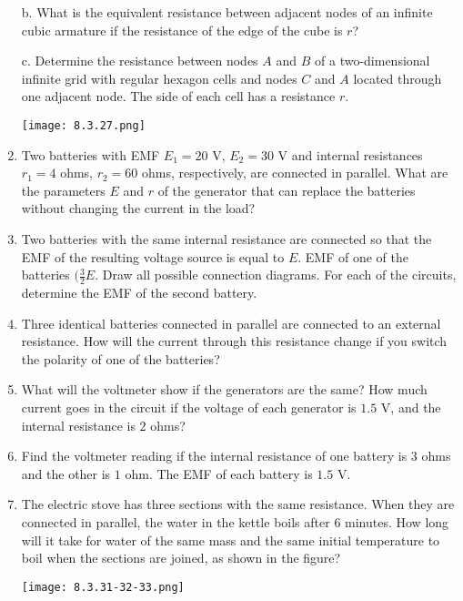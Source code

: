 \documentclass{article}
\begin{document}
\begin{enumerate}[label=8.3.\arabic*]
b. What is the equivalent resistance between adjacent nodes of an infinite cubic armature if the resistance of the edge of the cube is $r$?

c. Determine the resistance between nodes $A$ and $B$ of a two-dimensional infinite grid with regular hexagon cells and nodes $C$ and $A$ located through one adjacent node. The side of each cell has a resistance $r$.

\begin{center}
    \texttt{[image: 8.3.27.png]}
\end{center}


\item Two batteries with EMF $E_1 = 20$ V, $E_2 = 30$ V and internal resistances $r_1 = 4$ ohms, $r_2 = 60$ ohms, respectively, are connected in parallel. What are the parameters $E$ and $r$ of the generator that can replace the batteries without changing the current in the load?

\item Two batteries with the same internal resistance are connected so that the EMF of the resulting voltage source is equal to $E$. EMF of one of the batteries $(\frac{3}{2} E$. Draw all possible connection diagrams. For each of the circuits, determine the EMF of the second battery.

\item Three identical batteries connected in parallel are connected to an external resistance. How will the current through this resistance change if you switch the polarity of one of the batteries?

\item What will the voltmeter show if the generators are the same? How much current goes in the circuit if the voltage of each generator is $1.5$ V, and the internal resistance is $2$ ohms?

\item Find the voltmeter reading if the internal resistance of one battery is $3$ ohms and the other is $1$ ohm. The EMF of each battery is $1.5$ V.

\item The electric stove has three sections with the same resistance. When they are connected in parallel, the water in the kettle boils after $6$ minutes. How long will it take for water of the same mass and the same initial temperature to boil when the sections are joined, as shown in the figure?

\begin{center}
    \texttt{[image: 8.3.31-32-33.png]}
\end{center}



\end{enumerate}
\end{document}
